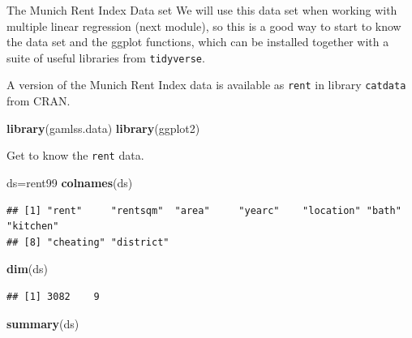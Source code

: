 \documentclass[
  ignorenonframetext,
]{beamer}
\newenvironment{Shaded}{\begin{snugshade}}{\end{snugshade}}
\newcommand{\FunctionTok}[1]{\textcolor[rgb]{0.13,0.29,0.53}{\textbf{#1}}}
\newcommand{\NormalTok}[1]{#1}
\newcommand{\OtherTok}[1]{\textcolor[rgb]{0.56,0.35,0.01}{#1}}
\begin{document}
\begin{frame}[fragile]
\begin{block}{The Munich Rent Index Data set}
\protect\hypertarget{the-munich-rent-index-data-set}{}
We will use this data set when working with multiple linear regression
(next module), so this is a good way to start to know the data set and
the ggplot functions, which can be installed together with a suite of
useful libraries from \texttt{tidyverse}.

A version of the Munich Rent Index data is available as \texttt{rent} in
library \texttt{catdata} from CRAN.

\begin{Shaded}
\begin{Highlighting}[]
\FunctionTok{library}\NormalTok{(gamlss.data)}
\FunctionTok{library}\NormalTok{(ggplot2)}
\end{Highlighting}
\end{Shaded}

Get to know the \texttt{rent} data.

\begin{Shaded}
\begin{Highlighting}[]
\NormalTok{ds}\OtherTok{=}\NormalTok{rent99}
\FunctionTok{colnames}\NormalTok{(ds)}
\end{Highlighting}
\end{Shaded}

\begin{verbatim}
## [1] "rent"     "rentsqm"  "area"     "yearc"    "location" "bath"     "kitchen" 
## [8] "cheating" "district"
\end{verbatim}

\begin{Shaded}
\begin{Highlighting}[]
\FunctionTok{dim}\NormalTok{(ds)}
\end{Highlighting}
\end{Shaded}

\begin{verbatim}
## [1] 3082    9
\end{verbatim}

\begin{Shaded}
\begin{Highlighting}[]
\FunctionTok{summary}\NormalTok{(ds)}
\end{Highlighting}
\end{Shaded}


\end{block}
\end{frame}
\end{document}
